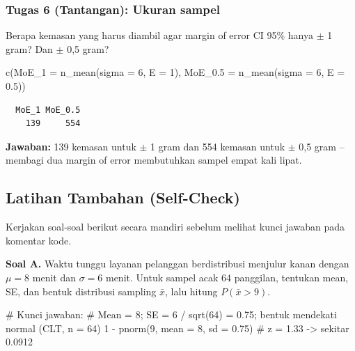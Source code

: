 \documentclass[
  indonesian,
  letterpaper,
]{book}
\newenvironment{Shaded}{\begin{snugshade}}{\end{snugshade}}
\newcommand{\AttributeTok}[1]{\textcolor[rgb]{0.40,0.45,0.13}{#1}}
\newcommand{\CommentTok}[1]{\textcolor[rgb]{0.37,0.37,0.37}{#1}}
\newcommand{\DecValTok}[1]{\textcolor[rgb]{0.68,0.00,0.00}{#1}}
\newcommand{\FloatTok}[1]{\textcolor[rgb]{0.68,0.00,0.00}{#1}}
\newcommand{\FunctionTok}[1]{\textcolor[rgb]{0.28,0.35,0.67}{#1}}
\newcommand{\NormalTok}[1]{\textcolor[rgb]{0.00,0.23,0.31}{#1}}
\newcommand{\SpecialCharTok}[1]{\textcolor[rgb]{0.37,0.37,0.37}{#1}}
\begin{document}
\subsubsection{\texorpdfstring{\textbf{Tugas 6 (Tantangan): Ukuran
sampel}}{Tugas 6 (Tantangan): Ukuran sampel}}\label{tugas-6-tantangan-ukuran-sampel}

Berapa kemasan yang harus diambil agar margin of error CI 95\% hanya
\(\pm\) 1 gram? Dan \(\pm\) 0,5 gram?

\begin{Shaded}
\begin{Highlighting}[]
\FunctionTok{c}\NormalTok{(}\AttributeTok{MoE\_1 =} \FunctionTok{n\_mean}\NormalTok{(}\AttributeTok{sigma =} \DecValTok{6}\NormalTok{, }\AttributeTok{E =} \DecValTok{1}\NormalTok{), }\AttributeTok{MoE\_0.5 =} \FunctionTok{n\_mean}\NormalTok{(}\AttributeTok{sigma =} \DecValTok{6}\NormalTok{, }\AttributeTok{E =} \FloatTok{0.5}\NormalTok{))}
\end{Highlighting}
\end{Shaded}

\begin{verbatim}
  MoE_1 MoE_0.5 
    139     554 
\end{verbatim}

\textbf{Jawaban:} 139 kemasan untuk \(\pm\) 1 gram dan 554 kemasan untuk
\(\pm\) 0,5 gram -- membagi dua margin of error membutuhkan sampel empat
kali lipat.

\subsection{Latihan Tambahan
(Self-Check)}\label{latihan-tambahan-self-check}

Kerjakan soal-soal berikut secara mandiri sebelum melihat kunci jawaban
pada komentar kode.

\textbf{Soal A.} Waktu tunggu layanan pelanggan berdistribusi menjulur
kanan dengan \(\mu = 8\) menit dan \(\sigma = 6\) menit. Untuk sampel
acak 64 panggilan, tentukan mean, SE, dan bentuk distribusi sampling
\(\bar{x}\), lalu hitung \(P(\bar{x} > 9)\).

\begin{Shaded}
\begin{Highlighting}[]
\CommentTok{\# Kunci jawaban:}
\CommentTok{\# Mean = 8; SE = 6 / sqrt(64) = 0.75; bentuk mendekati normal (CLT, n = 64)}
\DecValTok{1} \SpecialCharTok{{-}} \FunctionTok{pnorm}\NormalTok{(}\DecValTok{9}\NormalTok{, }\AttributeTok{mean =} \DecValTok{8}\NormalTok{, }\AttributeTok{sd =} \FloatTok{0.75}\NormalTok{)   }\CommentTok{\# z = 1.33 {-}\textgreater{} sekitar 0.0912}
\end{Highlighting}
\end{Shaded}
\end{document}
